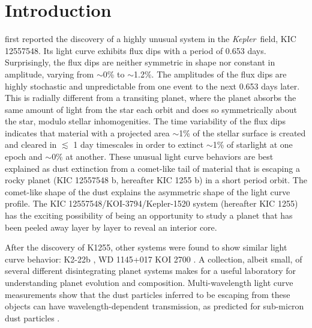 \documentclass[preprint,trackchanges]{aastex61}
\newcommand{\sha}{KIC 1255 b}
\newcommand{\shStar}{KIC 1255}
\newcommand{\kepler}{{\it Kepler}}
\begin{document}
\section{Introduction}\label{sec:intro}
\citet{rappaport} first reported the discovery of a highly unusual system in the \kepler\ field, KIC 12557548.
Its light curve exhibits flux dips with a period of 0.653 days.
Surprisingly, the flux dips are neither symmetric in shape nor constant in amplitude, varying from $\sim$0\% to $\sim$1.2\%.
The amplitudes of the flux dips are highly stochastic and unpredictable from one event to the next 0.653 days later.
This is radially different from a transiting planet, where the planet absorbs the same amount of light from the star each orbit and does so symmetrically about the star, modulo stellar inhomogenities.
The time variability of the flux dips indicates that material with a projected area $\sim$1\% of the stellar surface is created and cleared in $\lesssim$ 1 day timescales in order to extinct $\sim$1\% of starlight at one epoch and $\sim$0\% at another.
These unusual light curve behaviors are best explained as dust extinction from a comet-like tail of material that is escaping a rocky planet (KIC 12557548 b, hereafter \sha) in a short period orbit.
The comet-like shape of the dust explains the asymmetric shape of the light curve profile.
The KIC 12557548/KOI-3794/Kepler-1520 system (hereafter \shStar) has the exciting possibility of being an opportunity to study a planet that has been peeled away layer by layer to reveal an interior core.

After the discovery of K1255, other systems were found to show similar light curve behavior: K2-22b \citep{sanchis-ojedak2-22}, WD 1145+017 \citep{vanderburg2015wdDisintegrating}  KOI 2700 \citep{rappaport2014KOI2700} .
A collection, albeit small, of several different disintegrating planet systems makes for a useful laboratory for understanding planet evolution and composition.
Multi-wavelength light curve measurements show that the dust particles inferred to be escaping from these objects can have wavelength-dependent transmission, as predicted for sub-micron dust particles \citep{bochinski2015evolving,sanchis-ojedak2-22}.
\end{document}
